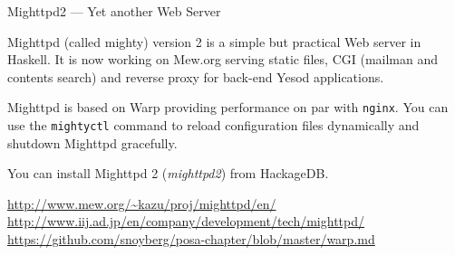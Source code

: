 \begin{hcarentry}[updated]{Mighttpd2 --- Yet another Web Server}
\label{mighttpd2}
\makeheader

Mighttpd (called mighty) version 2 is a simple but practical Web server in Haskell.
It is now working on Mew.org serving static files, CGI (mailman and contents search) and reverse proxy for back-end Yesod applications.

Mighttpd is based on Warp providing
performance on par with {\tt nginx}.
You can use the {\tt mightyctl} command to
reload configuration files dynamically and shutdown Mighttpd gracefully.

You can install Mighttpd 2 ({\it mighttpd2}) from HackageDB.

\FurtherReading
  \url{http://www.mew.org/~kazu/proj/mighttpd/en/}
  \url{http://www.iij.ad.jp/en/company/development/tech/mighttpd/}
  \url{https://github.com/snoyberg/posa-chapter/blob/master/warp.md}
\end{hcarentry}
